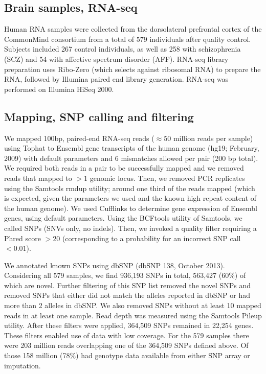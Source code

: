 \documentclass[letterpaper]{article}
\begin{document}
\subsection{Brain samples, RNA-seq}

Human RNA samples were collected from the dorsolateral prefrontal cortex of
the CommonMind consortium from a total of \(579\) individuals after
quality control. Subjects included 267 control individuals, as well as 258
with schizophrenia (SCZ) and 54 with affective spectrum disorder (AFF).
RNA-seq library preparation uses Ribo-Zero (which selects against ribosomal
RNA) to prepare the RNA, followed by Illumina paired end library generation.
RNA-seq was performed on Illumina HiSeq 2000.

\subsection{Mapping, SNP calling and filtering}

We mapped 100bp, paired-end RNA-seq reads (\(\approx50\) million reads per sample) using Tophat
to Ensembl gene transcripts of the human genome (hg19; February, 2009) with
default parameters and 6 mismatches allowed per pair (200 bp total). We
required both reads in a pair to be successfully mapped and we removed reads
that mapped to \(>1\) genomic locus. Then, we removed PCR replicates using the
Samtools rmdup utility; around one third of the reads mapped (which is
expected, given the parameters we used and the known high repeat content of
the human genome). We used Cufflinks to determine gene expression of Ensembl
genes, using default parameters. Using the BCFtools utility of Samtools, we
called SNPs (SNVs only, no indels). Then, we invoked a quality filter
requiring a Phred score \(>20\) (corresponding to a probability for an
incorrect SNP call \(<0.01\)).

We annotated known SNPs using dbSNP (dbSNP 138, October 2013). Considering all
579 samples, we find 936,193 SNPs in total, 563,427 (60\%) of which are novel.
Further filtering of this SNP list removed the novel SNPs and removed SNPs
that either did not match the alleles reported in dbSNP or had more than 2
alleles in dbSNP. We also removed SNPs without at least 10 mapped reads in at
least one sample. Read depth was measured using the Samtools Pileup utility.
After these filters were applied, 364,509 SNPs remained in 22,254 genes. These
filters enabled use of data with low coverage.  For the 579
samples there were 203 million reads overlapping one of the
364,509 SNPs defined above.  Of those 158 million (78\%) had genotype data
available from either SNP array or imputation.
\end{document}
